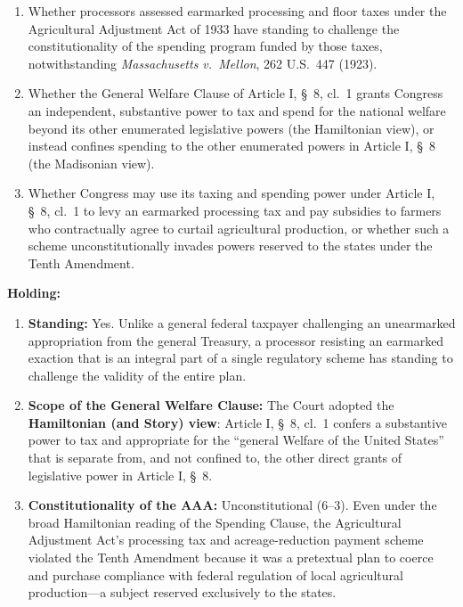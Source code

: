 \documentclass[12pt]{article}
\begin{document}
\begin{enumerate}
  \item Whether processors assessed earmarked processing and floor taxes under the Agricultural Adjustment Act of 1933 have standing to challenge the constitutionality of the spending program funded by those taxes, notwithstanding \textit{Massachusetts v.\ Mellon}, 262 U.S.\ 447 (1923).
  \item Whether the General Welfare Clause of Article I, \S\ 8, cl.\ 1 grants Congress an independent, substantive power to tax and spend for the national welfare beyond its other enumerated legislative powers (the Hamiltonian view), or instead confines spending to the other enumerated powers in Article I, \S\ 8 (the Madisonian view).
  \item Whether Congress may use its taxing and spending power under Article I, \S\ 8, cl.\ 1 to levy an earmarked processing tax and pay subsidies to farmers who contractually agree to curtail agricultural production, or whether such a scheme unconstitutionally invades powers reserved to the states under the Tenth Amendment.
\end{enumerate}

\textbf{Holding:}

\begin{enumerate}
  \item \textbf{Standing:} Yes. Unlike a general federal taxpayer challenging an unearmarked appropriation from the general Treasury, a processor resisting an earmarked exaction that is an integral part of a single regulatory scheme has standing to challenge the validity of the entire plan.
  \item \textbf{Scope of the General Welfare Clause:} The Court adopted the \textbf{Hamiltonian (and Story) view}: Article I, \S\ 8, cl.\ 1 confers a substantive power to tax and appropriate for the ``general Welfare of the United States'' that is separate from, and not confined to, the other direct grants of legislative power in Article I, \S\ 8.
  \item \textbf{Constitutionality of the AAA:} Unconstitutional (6--3). Even under the broad Hamiltonian reading of the Spending Clause, the Agricultural Adjustment Act's processing tax and acreage-reduction payment scheme violated the Tenth Amendment because it was a pretextual plan to coerce and purchase compliance with federal regulation of local agricultural production---a subject reserved exclusively to the states.
\end{enumerate}
\end{document}
